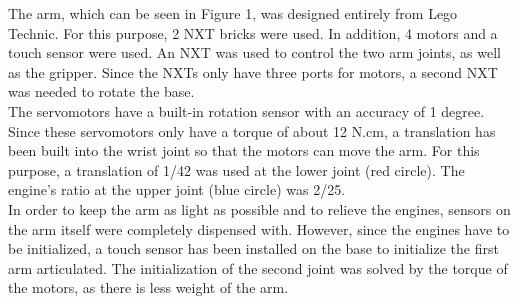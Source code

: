 \documentclass[conference]{IEEEtran}
\begin{document}
The arm, which can be seen in Figure 1, was designed entirely from Lego Technic. For this purpose, 2 NXT bricks were used. In addition, 4 motors and a touch sensor were used. An NXT was used to control the two arm joints, as well as the gripper. Since the NXTs only have three ports for motors, a second NXT was needed to rotate the base.\\
The servomotors have a built-in rotation sensor with an accuracy of 1 degree. Since these servomotors only have a torque of about 12 N.cm, a translation has been built into the wrist joint so that the motors can move the arm. For this purpose, a translation of 1/42 was used at the lower joint (red circle). The engine's ratio at the upper joint (blue circle) was 2/25.\\
In order to keep the arm as light as possible and to relieve the engines, sensors on the arm itself were completely dispensed with. However, since the engines have to be initialized, a touch sensor has been installed on the base to initialize the first arm articulated. The initialization of the second joint was solved by the torque of the motors, as there is less weight of the arm.
\end{document}
